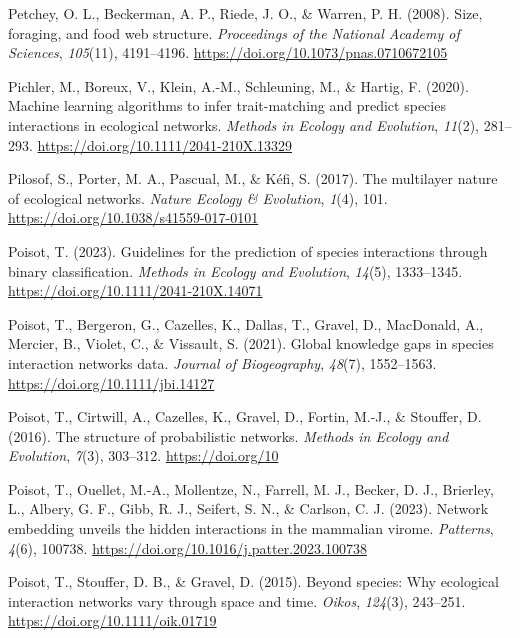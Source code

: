 \documentclass[
]{article}
\newlength{\cslhangindent}
\newenvironment{CSLReferences}[2] %
 {\begin{list}{}{%
  \setlength{\itemindent}{0pt}
  \setlength{\leftmargin}{0pt}
  \setlength{\parsep}{0pt}
  \ifodd #1
   \setlength{\leftmargin}{\cslhangindent}
   \setlength{\itemindent}{-1\cslhangindent}
  \fi
  \setlength{\itemsep}{#2\baselineskip}}}
 {\end{list}}
\begin{document}
\begin{CSLReferences}{1}{0}
Petchey, O. L., Beckerman, A. P., Riede, J. O., \& Warren, P. H. (2008).
Size, foraging, and food web structure. \emph{Proceedings of the
National Academy of Sciences}, \emph{105}(11), 4191--4196.
\url{https://doi.org/10.1073/pnas.0710672105}

Pichler, M., Boreux, V., Klein, A.-M., Schleuning, M., \& Hartig, F.
(2020). Machine learning algorithms to infer trait-matching and predict
species interactions in ecological networks. \emph{Methods in Ecology
and Evolution}, \emph{11}(2), 281--293.
\url{https://doi.org/10.1111/2041-210X.13329}

Pilosof, S., Porter, M. A., Pascual, M., \& Kéfi, S. (2017). The
multilayer nature of ecological networks. \emph{Nature Ecology \&
Evolution}, \emph{1}(4), 101.
\url{https://doi.org/10.1038/s41559-017-0101}

Poisot, T. (2023). Guidelines for the prediction of species interactions
through binary classification. \emph{Methods in Ecology and Evolution},
\emph{14}(5), 1333--1345. \url{https://doi.org/10.1111/2041-210X.14071}

Poisot, T., Bergeron, G., Cazelles, K., Dallas, T., Gravel, D.,
MacDonald, A., Mercier, B., Violet, C., \& Vissault, S. (2021). Global
knowledge gaps in species interaction networks data. \emph{Journal of
Biogeography}, \emph{48}(7), 1552--1563.
\url{https://doi.org/10.1111/jbi.14127}

Poisot, T., Cirtwill, A., Cazelles, K., Gravel, D., Fortin, M.-J., \&
Stouffer, D. (2016). The structure of probabilistic networks.
\emph{Methods in Ecology and Evolution}, \emph{7}(3), 303--312.
\url{https://doi.org/10}

Poisot, T., Ouellet, M.-A., Mollentze, N., Farrell, M. J., Becker, D.
J., Brierley, L., Albery, G. F., Gibb, R. J., Seifert, S. N., \&
Carlson, C. J. (2023). Network embedding unveils the hidden interactions
in the mammalian virome. \emph{Patterns}, \emph{4}(6), 100738.
\url{https://doi.org/10.1016/j.patter.2023.100738}

Poisot, T., Stouffer, D. B., \& Gravel, D. (2015). Beyond species: Why
ecological interaction networks vary through space and time.
\emph{Oikos}, \emph{124}(3), 243--251.
\url{https://doi.org/10.1111/oik.01719}


\end{CSLReferences}
\end{document}
